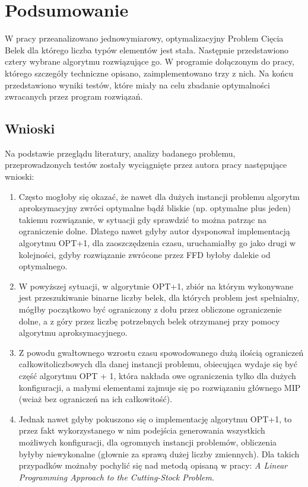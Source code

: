 \chapter*{Podsumowanie}
\thispagestyle{chapterBeginStyle}

W pracy przeanalizowano jednowymiarowy, optymalizacyjny Problem Cięcia Belek dla którego liczba typów elementów jest stała. 
Następnie przedstawiono cztery wybrane algorytmu rozwiązujące go. W programie dołączonym do pracy, którego szczegóły techniczne opisano, zaimplementowano trzy z nich. Na końcu przedstawiono wyniki testów, które miały na celu zbadanie optymalności zwracanych przez program rozwiązań.

\section{Wnioski}
Na podstawie przeglądu literatury, analizy badanego problemu, przeprowadzonych testów zostały wyciągnięte  przez autora pracy następujące wnioski:
\begin{enumerate}
	\item Często mogłoby się okazać, że nawet dla dużych instancji problemu algorytm aproksymacyjny zwróci optymalne bądź bliskie (np. optymalne plus jeden) takiemu rozwiązanie, w sytuacji gdy sprawdzić to można patrząc na ograniczenie dolne. Dlatego nawet gdyby autor dysponował implementacją algorytmu OPT+1, dla zaoszczędzenia czasu, uruchamiałby go jako drugi w kolejności, gdyby rozwiązanie zwrócone przez FFD byłoby dalekie od optymalnego.
	\item W powyższej sytuacji, w algorytmie OPT+1, zbiór na którym wykonywane jest przeszukiwanie binarne liczby belek, dla których problem jest spełnialny, mógłby początkowo być ograniczony z dołu przez obliczone ograniczenie dolne, a z góry przez liczbę potrzebnych belek otrzymanej przy pomocy algorytmu aproksymacyjnego.
	\item Z powodu gwałtownego wzrostu czasu spowodowanego dużą ilością ograniczeń całkowitoliczbowych dla danej instancji problemu, obiecująca wydaje się być część algorytmu OPT + 1, która nakłada owe ograniczenia tylko dla dużych konfiguracji, a małymi elementami zajmuje się po rozwiązaniu głównego MIP (wciaż bez ograniczeń na ich całkowitość).
	\item Jednak nawet gdyby pokuszono się o implementację algorytmu OPT+1, to przez fakt wykorzystanego w nim podejścia generowania wszystkich możliwych konfiguracji, dla ogromnych instancji problemów, obliczenia byłyby niewykonalne (głownie za sprawą dużej liczby zmiennych). Dla takich przypadków możnaby pochylić się nad metodą opisaną w pracy: \textit{A Linear Programming Approach to the Cutting-Stock Problem}\cite{GOMORY}.

\end{enumerate}

